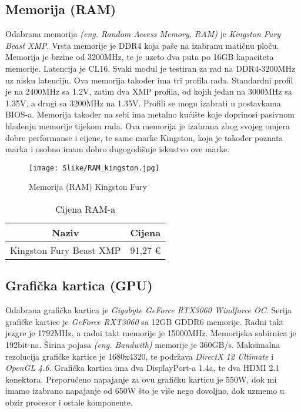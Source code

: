 \documentclass[14pt]{article}
\begin{document}
    \clearpage
    \subsection{Memorija (RAM)}
    Odabrana memorija \emph{(eng. Random Access Memory, RAM)} je \textit{Kingston Fury Beast XMP}. Vrsta memorije je DDR4 koja paše na izabranu matičnu ploču. Memorija je brzine od 3200MHz, te je uzeto dva puta po 16GB kapaciteta memorije. Latencija je CL16. Svaki modul je testiran za rad na DDR4-3200MHz uz nisku latenciju. Ova memorija također ima tri profila rada. Standardni profil je na 2400MHz sa 1.2V, zatim dva XMP profila, od kojih jedan na 3000MHz sa 1.35V, a drugi sa 3200MHz na 1.35V. Profili se mogu izabrati u postavkama BIOS-a. Memorija također na sebi ima metalno kućište koje doprinosi pasivnom hlađenju memorije tijekom rada. Ova memorija je izabrana zbog svojeg omjera dobre performanse i cijene, te same marke Kingston, koja je također poznata marka i osobno imam dobro dugogodišnje iskustvo ove marke.

    \begin{figure}[H]
        \centering
        \texttt{[image: Slike/RAM\_kingston.jpg]}
        \caption{Memorija (RAM) Kingston Fury}
        \label{fig:Memorija}
    \end{figure}

    \begin{table}[H]
        \centering
        \begin{tabular}{|c|c|}
            \hline
            Naziv & Cijena \\
            \hline
            Kingston Fury Beast XMP & 91,27 € \\
            \hline
        \end{tabular}
        \caption{Cijena RAM-a}
        \label{tab:Memorija}
    \end{table}

    \clearpage
    \subsection{Grafička kartica (GPU)}
    Odabrana grafička kartica je \textit{Gigabyte GeForce RTX3060 Windforce OC}. Serija grafičke kartice je \textit{GeForce RXT3060} sa 12GB GDDR6 memorije. Radni takt jezgre je 1792MHz, a radni takt memorije je 15000MHz. Memorijska sabirnica je 192bit-na. Širina pojasa \emph{(eng. Bandwith)} memorije je 360GB/s. Maksimalna rezolucija grafičke kartice je 1680x4320, te podržava \textit{DirectX 12 Ultimate} i \textit{OpenGL 4.6}. Grafička kartica ima dva DisplayPort-a 1.4a, te dva HDMI 2.1 konektora. Preporučeno napajanje za ovu grafičku karticu je 550W, dok mi imamo izabrano napajanje od 650W što je više nego dovoljno, dok uzmemo u obzir procesor i ostale komponente.
\end{document}
